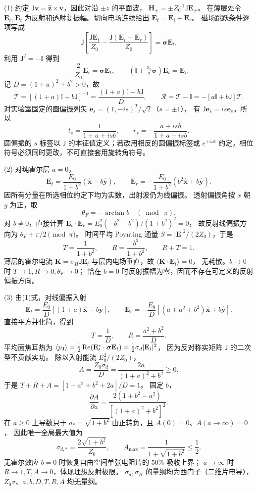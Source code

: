 (1) 约定 \(\mathsf J\mathbf v=\hat{\mathbf z}\times\mathbf v\)，因此对沿 \(\pm z\) 的平面波，
\(\mathbf H_\pm=\pm Z_0^{-1}\mathsf J\mathbf E_\pm\)。
在薄层处令 \(\mathbf E_r,\mathbf E_t\) 为反射和透射复振幅。切向电场连续给出
\(\mathbf E_t=\mathbf E_i+\mathbf E_r\)。
磁场跳跃条件逐项写成
\[
\mathsf J\left[\frac{\mathsf J\mathbf E_t}{Z_0}
-\frac{\mathsf J(\mathbf E_i-\mathbf E_r)}{Z_0}\right]
=\boldsymbol{\sigma}\mathbf E_t.
\]
利用 \(\mathsf J^2=-\mathbb I\) 得到
\[
-\frac{2}{Z_0}\mathbf E_r=\boldsymbol{\sigma}\mathbf E_t,\qquad
(\mathbb I+\tfrac{Z_0}{2}\boldsymbol{\sigma})\mathbf E_t=\mathbf E_i.
\]
记 \(D=(1+a)^2+b^2>0\)，故
\[
\boxed{\mathcal T=[(1+a)\mathbb I+b\mathsf J]^{-1}
=\frac{(1+a)\mathbb I-b\mathsf J}{D}},\qquad
\boxed{\mathcal R=\mathcal T-\mathbb I=-[a\mathbb I+b\mathsf J]\mathcal T}.
\]
对实验室固定的圆偏振列矢 \(\mathbf e_s=(1,-is)^T/\sqrt2\)（\(s=\pm1\)），
有 \(\mathsf J\mathbf e_s=is\mathbf e_s\)。所以
\[
\boxed{t_s=\frac1{1+a+is b}},\qquad
\boxed{r_s=-\frac{a+is b}{1+a+is b}}.
\]
圆偏振的 \(s\) 标签以 \(\mathsf J\) 的本征值定义；若改用相反的圆偏振标签或 \(e^{+i\omega t}\) 约定，相位符号必须同时更改，不可直接套用旋转角符号。

(2) 对纯霍尔层 \(a=0\)，
\[
\boxed{\mathbf E_t=\frac{E_0}{1+b^2}(\hat{\mathbf x}-b\hat{\mathbf y})},\qquad
\boxed{\mathbf E_r=-\frac{E_0}{1+b^2}(b^2\hat{\mathbf x}+b\hat{\mathbf y})}.
\]
因所有分量在所选相位约定下均为实数，出射波仍为线偏振。
透射偏振角按 \(x\) 朝 \(y\) 为正，取
\[
\boxed{\theta_F=-\arctan b\quad(\bmod\ \pi)}.
\]
对 \(b\ne0\)，直接计算
\(\mathbf E_t\cdot\mathbf E_r
=E_0^2(-b^2+b^2)/(1+b^2)^2=0\)，
故反射线偏振方向为 \(\theta_F+\pi/2\pmod\pi\)。
时间平均 Poynting 通量 \(S=|\mathbf E|^2/(2Z_0)\)，于是
\[
\boxed{T=\frac1{1+b^2}},\qquad
\boxed{R=\frac{b^2}{1+b^2}},\qquad R+T=1.
\]
薄层的霍尔电流 \(\mathbf K=\sigma_H\mathsf J\mathbf E_t\)
与层内电场垂直，故 \(\langle\mathbf K\cdot\mathbf E_t\rangle=0\)，
无耗散。\(b\to0\) 时 \(T\to1,R\to0,\theta_F\to0\)；
恰在 \(b=0\) 时反射振幅为零，因而不存在可定义的反射偏振方向。

(3) 由(1)式，对线偏振入射
\[
\mathbf E_t=\frac{E_0}{D}[(1+a)\hat{\mathbf x}-b\hat{\mathbf y}],\qquad
\mathbf E_r=-\frac{E_0}{D}[(a+a^2+b^2)\hat{\mathbf x}+b\hat{\mathbf y}].
\]
直接平方并化简，得到
\[
\boxed{T=\frac1D},\qquad
\boxed{R=\frac{a^2+b^2}{D}}.
\]
平均面焦耳热为
\(\langle p_{\rm J}\rangle
=\tfrac12\operatorname{Re}(\mathbf E_t^*\cdot\boldsymbol{\sigma}\mathbf E_t)
=\tfrac12\sigma_d|\mathbf E_t|^2\)，
因为反对称实矩阵 \(\mathsf J\) 的二次型不贡献实功。
除以入射能流 \(E_0^2/(2Z_0)\)，
\[
\boxed{A=\frac{Z_0\sigma_d}{D}=\frac{2a}{(1+a)^2+b^2}\ge0}.
\]
于是 \(T+R+A=[1+a^2+b^2+2a]/D=1\)。
固定 \(b\)，
\[
\frac{\partial A}{\partial a}
=\frac{2(1+b^2-a^2)}{[(1+a)^2+b^2]^2}.
\]
在 \(a\ge0\) 上导数只于
\(a_*=\sqrt{1+b^2}\) 由正转负，且 \(A(0)=0\)、\(A(a\to\infty)=0\)，
因此唯一全局最大值为
\[
\boxed{\sigma_{d,*}=\frac{2\sqrt{1+b^2}}{Z_0}},\qquad
\boxed{A_{\max}=\frac1{1+\sqrt{1+b^2}}\le\frac12}.
\]
无霍尔效应 \(b=0\) 时恢复自由空间单张电阻片的 \(50\%\) 吸收上界；
\(a\to\infty\) 时 \(R\to1,T,A\to0\)，体现理想反射极限。
\(\sigma_d,\sigma_H\) 的量纲均为西门子（二维片电导），
\(Z_0\sigma\)、\(a,b,D,T,R,A\) 均无量纲。

